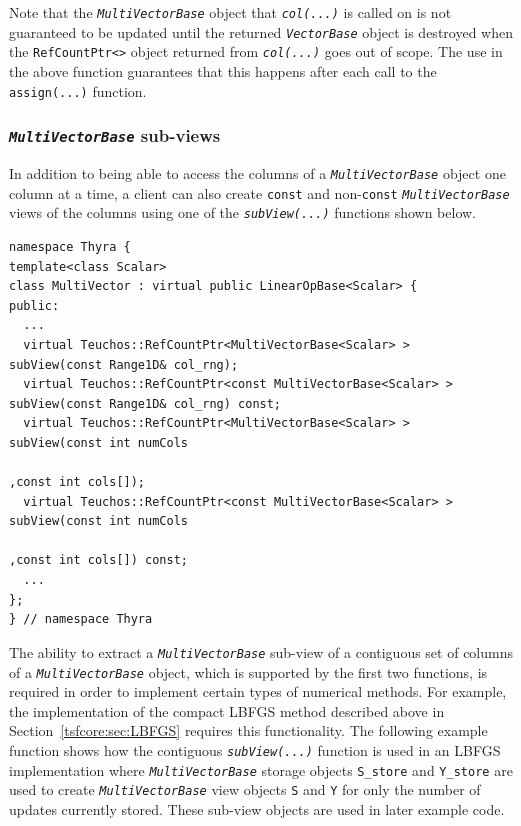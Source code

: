 \documentclass[pdf,ps2pdf,11pt]{SANDreport}
\begin{document}
{}\noindent{}Note that the {}\texttt{\textit{Multi\-Vector\-Base}} object
that {}\texttt{\textit{col(...)}} is called on is not guaranteed to be
updated until the returned {}\texttt{\textit{Vector\-Base}} object is
destroyed when the {}\texttt{RefCountPtr<>} object returned from
{}\texttt{\textit{col(...)}} goes out of scope.  The use in the above
function guarantees that this happens after each call to the
{}\texttt{assign(...)} function.

%
\subsubsection{\texttt{\textit{Multi\-Vector\-Base}} sub-views}
%

In addition to being able to access the columns of a
{}\texttt{\textit{Multi\-Vector\-Base}} object one column at a time, a client
can also create {}\texttt{const} and non-\texttt{const}
{}\texttt{\textit{Multi\-Vector\-Base}} views of the columns
using one of the {}\texttt{\textit{subView(...)}} functions shown below.

{\scriptsize\begin{verbatim}
namespace Thyra {
template<class Scalar>
class MultiVector : virtual public LinearOpBase<Scalar> {
public:
  ...
  virtual Teuchos::RefCountPtr<MultiVectorBase<Scalar> >       subView(const Range1D& col_rng);
  virtual Teuchos::RefCountPtr<const MultiVectorBase<Scalar> > subView(const Range1D& col_rng) const;
  virtual Teuchos::RefCountPtr<MultiVectorBase<Scalar> >       subView(const int numCols
                                                                        ,const int cols[]);
  virtual Teuchos::RefCountPtr<const MultiVectorBase<Scalar> > subView(const int numCols
                                                                        ,const int cols[]) const;
  ...
};
} // namespace Thyra
\end{verbatim}}

{}\noindent{}The ability to extract a {}\texttt{\textit{Multi\-Vector\-Base}}
sub-view of a contiguous set of columns of a
{}\texttt{\textit{Multi\-Vector\-Base}} object, which is supported by the
first two functions, is required in order to implement certain types of
numerical methods.  For example, the implementation of the compact LBFGS
method described above in Section~\ref{tsfcore:sec:LBFGS} requires this
functionality.  The following example function shows how the contiguous
{}\texttt{\textit{subView(...)}} function is used in an LBFGS implementation
where {}\texttt{\textit{Multi\-Vector\-Base}} storage objects
{}\texttt{S\_store} and {}\texttt{Y\_store} are used to create
{}\texttt{\textit{Multi\-Vector\-Base}} view objects {}\texttt{S} and
{}\texttt{Y} for only the number of updates currently stored.  These sub-view
objects are used in later example code.
\end{document}
